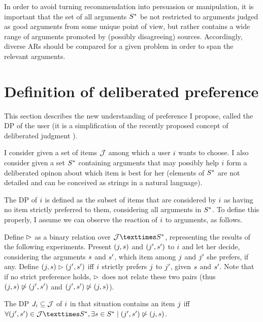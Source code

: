\documentclass[french, english]{da2pl2018}
\begin{document}
In order to avoid turning recommendation into persuasion or manipulation, 
it is important that the set of all arguments $S^*$ be not restricted to arguments judged as good arguments from some unique point of view, but rather contains a wide range of arguments promoted by (possibly disagreeing) sources. Accordingly, diverse \acp{AR} should be compared for a given problem in order to span the relevant arguments.

\section{Definition of deliberated preference}
\label{sec:def}
This section describes the new understanding of preference I propose, called the \ac{DP} of the user (it is a simplification of the recently proposed concept of deliberated judgment \citep{cailloux_formal_2018}).

I consider given a set of items $\mathcal{J}$ among which a user $i$ wants to choose. I also consider given a set $S^*$ containing arguments that may possibly help $i$ form a deliberated opinon about which item is best for her (elements of $S^*$ are not detailed and can be conceived as strings in a natural language). 

The \ac{DP} of $i$ is defined as the subset of items that are considered by $i$ as having no item strictly preferred to them, considering all arguments in $S^*$. To define this properly, I assume we can observe the reaction of $i$ to arguments, as follows. 

Define $\vartriangleright$ as a binary relation over $\allitems × \allargs$, representing the results of the following experiments. Present $(j, s)$ and $(j', s')$ to $i$ and let her decide, considering the arguments $s$ and $s'$, which item among $j$ and $j'$ she prefers, if any. 
Define $(j, s) \vartriangleright (j', s')$ iff $i$ strictly prefers $j$ to $j'$, given $s$ and $s'$. Note that if no strict preference holds, $\vartriangleright$ does not relate these two pairs (thus $(j, s) \not\vartriangleright (j', s')$ and $(j', s') \not\vartriangleright (j, s)$). 

The \ac{DP} $J_i \subseteq \mathcal{J}$ of $i$ in that situation contains an item $j$ iff $\forall (\itm', \ar') \in \allitems × \allargs, \exists \ar \in \allargs \suchthat (\itm', \ar') \nibeats (\itm, \ar)$.
\end{document}
